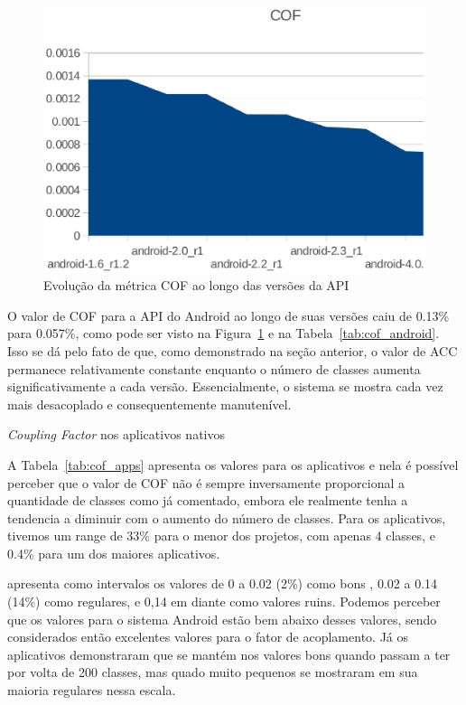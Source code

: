 \begin{figure}[!htb]
\centering
\includegraphics [keepaspectratio=true,scale=0.7]{figuras/graphs/cof_android.eps}
\caption{Evolução da métrica COF ao longo das versões da API}
\label{fig:cof_android}
\end{figure}


O valor de COF para a API do Android ao longo de suas versões caiu de 0.13\% para 0.057\%, como pode ser visto na Figura~\ref{fig:cof_android} e na Tabela~\ref{tab:cof_android}. Isso se dá pelo fato de que, como demonstrado na seção anterior, o valor de ACC permanece relativamente constante enquanto o número de classes aumenta significativamente a cada versão. Essencialmente, o sistema se mostra cada vez mais desacoplado e consequentemente manutenível. 

\begin{table}[!htb]
\centering
{}

\caption{\textit{Coupling Factor} nos aplicativos nativos}
\label{tab:cof_apps}
\end{table}

A Tabela~\ref{tab:cof_apps} apresenta os valores para os aplicativos e nela é possível perceber que o valor de COF não é sempre inversamente proporcional a quantidade de classes como já comentado, embora ele realmente tenha a tendencia a diminuir com o aumento do número de classes. Para os aplicativos, tivemos um range de 33\% para o menor dos projetos, com apenas 4 classes, e 0.4\% para um dos maiores aplicativos.

 apresenta como intervalos os valores de 0 a 0.02 (2\%) como bons , 0.02 a 0.14 (14\%) como regulares, e 0,14 em diante como valores ruins. Podemos perceber que os valores para o sistema Android estão bem abaixo desses valores, sendo considerados então excelentes valores para o fator de acoplamento. Já os aplicativos demonstraram que se mantém nos valores bons quando passam a ter por volta de 200 classes, mas quado muito pequenos se mostraram em sua maioria regulares nessa escala. 

